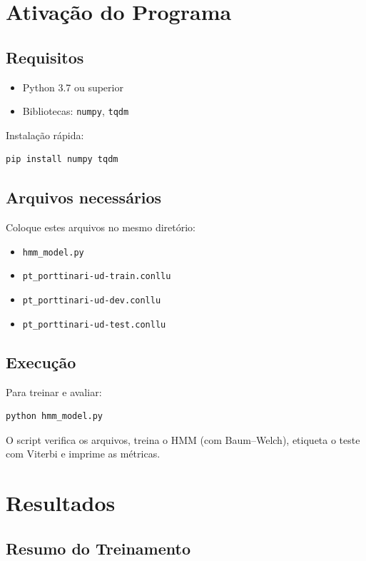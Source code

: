 \documentclass[12pt,a4paper]{article}
\begin{document}
\section{Ativação do Programa}

\subsection{Requisitos}

\begin{itemize}
    \item Python 3.7 ou superior
    \item Bibliotecas: \texttt{numpy}, \texttt{tqdm}
\end{itemize}

Instalação rápida:
\begin{lstlisting}[language=bash]
pip install numpy tqdm
\end{lstlisting}

\subsection{Arquivos necessários}

Coloque estes arquivos no mesmo diretório:
\begin{itemize}
    \item \texttt{hmm\_model.py}
    \item \texttt{pt\_porttinari-ud-train.conllu}
    \item \texttt{pt\_porttinari-ud-dev.conllu}
    \item \texttt{pt\_porttinari-ud-test.conllu}
\end{itemize}

\subsection{Execução}

Para treinar e avaliar:
\begin{lstlisting}[language=bash]
python hmm_model.py
\end{lstlisting}

O script verifica os arquivos, treina o HMM (com Baum–Welch), etiqueta o teste com Viterbi e imprime as métricas.

\section{Resultados}

\subsection{Resumo do Treinamento}
\end{document}
